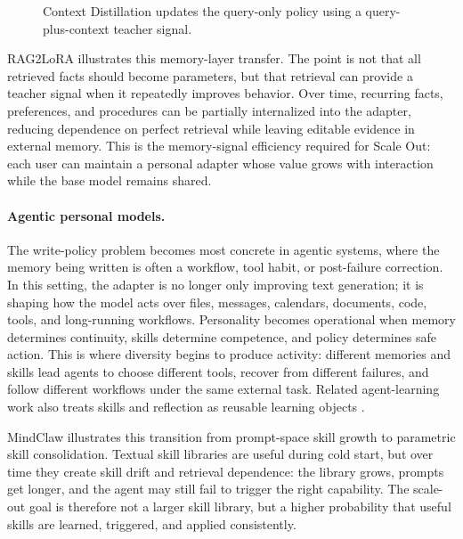 \documentclass{llmxive}
\begin{document}
\begin{figure}[tbp]
{
}
\caption{Context Distillation updates the query-only policy using a query-plus-context teacher signal.}\label{fig:context-distillation}
\end{figure}

RAG2LoRA illustrates this memory-layer transfer. The point is not that all retrieved facts should become parameters, but that retrieval can provide a teacher signal when it repeatedly improves behavior. Over time, recurring facts, preferences, and procedures can be partially internalized into the adapter, reducing dependence on perfect retrieval while leaving editable evidence in external memory. This is the memory-signal efficiency required for Scale Out: each user can maintain a personal adapter whose value grows with interaction while the base model remains shared.

\paragraph{Agentic personal models.}
The write-policy problem becomes most concrete in agentic systems, where the memory being written is often a workflow, tool habit, or post-failure correction. In this setting, the adapter is no longer only improving text generation; it is shaping how the model acts over files, messages, calendars, documents, code, tools, and long-running workflows. Personality becomes operational when memory determines continuity, skills determine competence, and policy determines safe action. This is where diversity begins to produce activity: different memories and skills lead agents to choose different tools, recover from different failures, and follow different workflows under the same external task. Related agent-learning work also treats skills and reflection as reusable learning objects \citep{shinn2023reflexion,xia2026skillrl}.

MindClaw \citep{li2026mindclaw} illustrates this transition from prompt-space skill growth to parametric skill consolidation. Textual skill libraries are useful during cold start, but over time they create skill drift and retrieval dependence: the library grows, prompts get longer, and the agent may still fail to trigger the right capability. The scale-out goal is therefore not a larger skill library, but a higher probability that useful skills are learned, triggered, and applied consistently.
\end{document}

